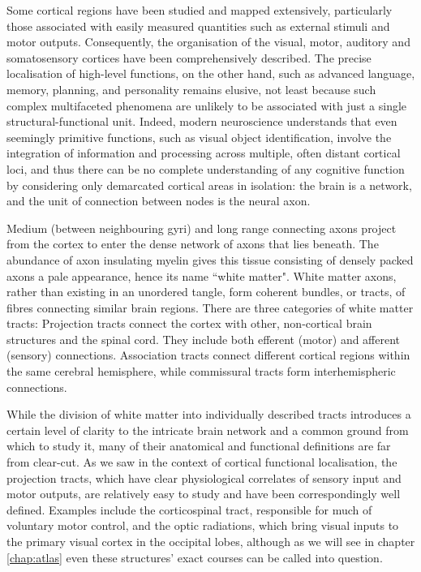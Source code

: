 Some cortical regions have been studied and mapped extensively, particularly those associated with easily measured quantities such as external stimuli and motor outputs.
Consequently, the organisation of the visual, motor, auditory and somatosensory cortices have been comprehensively described.
The precise localisation of high-level functions, on the other hand, such as advanced language, memory, planning, and personality remains elusive, not least because such complex multifaceted phenomena are unlikely to be associated with just a single structural-functional unit.\autocite{Catani2007}
Indeed, modern neuroscience understands that even seemingly primitive functions, such as visual object identification, involve the integration of information and processing across multiple, often distant cortical loci,\autocite{ffytche2005} and thus there can be no complete understanding of any cognitive function by considering only demarcated cortical areas in isolation: the brain is a network, and the unit of connection between nodes is the neural axon.

Medium (between neighbouring gyri) and long range connecting axons project from the cortex to enter the dense network of axons that lies beneath.
The abundance of axon insulating myelin gives this tissue consisting of densely packed axons a pale appearance, hence its name ``white matter".
White matter axons, rather than existing in an unordered tangle, form coherent bundles, or tracts, of fibres connecting similar brain regions.
There are three categories of white matter tracts:
Projection tracts connect the cortex with other, non-cortical brain structures and the spinal cord.
They include both efferent (motor) and afferent (sensory) connections.
Association tracts connect different cortical regions within the same cerebral hemisphere, while commissural tracts form interhemispheric connections.

While the division of white matter into individually described tracts introduces a certain level of clarity to the intricate brain network and a common ground from which to study it, many of their anatomical and functional definitions are far from clear-cut.
As we saw in the context of cortical functional localisation, the projection tracts, which have clear physiological correlates of sensory input and motor outputs, are relatively easy to study and have been correspondingly well defined.
Examples include the corticospinal tract, responsible for much of voluntary motor control, and the optic radiations, which bring visual inputs to the primary visual cortex in the occipital lobes, although as we will see in chapter \ref{chap:atlas} even these structures' exact courses can be called into question.

